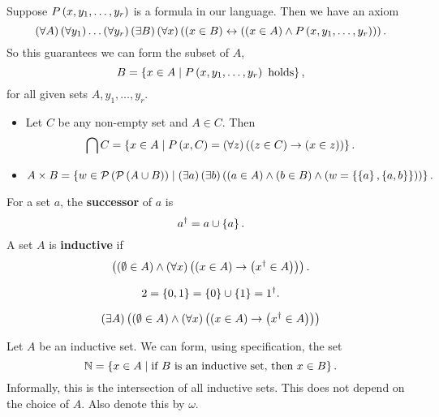 \pagebreak

\begin{axiom}
Suppose $ P\left( x, y_1, \dots, y_r \right) $ is a formula in our language. Then we have an axiom
$$ \left( \forall A \right)\left( \forall y_1 \right) \dots \left( \forall y_r \right)\left( \exists B \right)\left( \forall x \right)\left( \left( x \in B \right) \leftrightarrow \left( \left( x \in A \right) \land P\left( x, y_1, \dots, y_r \right) \right) \right). $$
So this guarantees we can form the subset of $ A $,
$$ B = \left\{ x \in A \mid P\left( x, y_1, \dots, y_r \right) \ \text{holds} \right\}, $$
for all given sets $ A, y_1, \dots, y_r $.
\end{axiom}

\begin{example*}
\hfill
\begin{itemize}
\item Let $ C $ be any non-empty set and $ A \in C $. Then
$$ \bigcap C = \left\{ x \in A \mid P\left( x, C \right) = \left( \forall z \right)\left( \left( z \in C \right) \rightarrow \left( x \in z \right) \right) \right\}. $$
\item
$$ A \times B = \left\{ w \in \mathcal{P}\left( \mathcal{P}\left( A \cup B \right) \right) \mid \left( \exists a \right)\left( \exists b \right)\left( \left( a \in A \right) \land \left( b \in B \right) \land \left( w = \left\{ \left\{ a \right\}, \left\{ a, b \right\} \right\} \right) \right) \right\}. $$
\end{itemize}
\end{example*}

\begin{definition}
For a set $ a $, the \textbf{successor} of $ a $ is
$$ a^\dagger = a \cup \left\{ a \right\}. $$
A set $ A $ is \textbf{inductive} if
$$ \left( \left( \emptyset \in A \right) \land \left( \forall x \right)\left( \left( x \in A \right) \rightarrow \left( x^\dagger \in A \right) \right) \right). $$
\end{definition}

\begin{example*}
$$ 2 = \left\{ 0, 1 \right\} = \left\{ 0 \right\} \cup \left\{ 1 \right\} = 1^\dagger. $$
\end{example*}

\begin{axiom}
$$ \left( \exists A \right)\left( \left( \emptyset \in A \right) \land \left( \forall x \right)\left( \left( x \in A \right) \rightarrow \left( x^\dagger \in A \right) \right) \right) $$
\end{axiom}

\begin{definition}
Let $ A $ be an inductive set. We can form, using specification, the set
$$ \mathbb{N} = \left\{ x \in A \mid \text{if} \ B \ \text{is an inductive set, then} \ x \in B \right\}. $$
Informally, this is the intersection of all inductive sets. This does not depend on the choice of $ A $. Also denote this by $ \omega $.
\end{definition}

